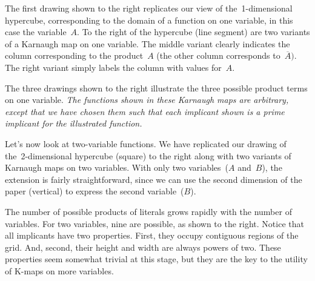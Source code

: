 \begin{minipage}{4.25in}
The first drawing shown to the right replicates our view of 
the~\mbox{1-dimensional} hypercube, corresponding to the domain of a
function on one variable, in this case the variable~$A$.  
To the right of the hypercube (line segment) are two variants
of a Karnaugh map on one variable.  The middle variant clearly 
indicates the column corresponding to the product~$A$ (the other 
column corresponds to~$\overline{A})$.  The right variant simply labels
the column with values for~$A$.
\end{minipage}\hspace{0.25in}%
\begin{minipage}{2.0in}
\vspace{12pt}
\end{minipage}

\begin{minipage}{4.25in}
The three drawings shown to the right illustrate the three possible product
terms on one variable.  {\em The functions shown in 
these Karnaugh maps are arbitrary, except that we have chosen
them such that each implicant shown is a prime implicant for the
illustrated function.}
\end{minipage}\hspace{0.25in}%
\begin{minipage}{2.0in}
\centerline{}
\end{minipage}


\begin{minipage}{3.5in}
Let's now look at two-variable functions.  We have replicated
our drawing of the~\mbox{2-dimensional} hypercube (square) to the right 
along with two variants of Karnaugh maps on two variables.
With only two variables~($A$ and~$B$), the extension is fairly 
straightforward, since we can use the second dimension of the 
paper (vertical) to express the second variable~($B$).
\end{minipage}\hspace{0.25in}%
\begin{minipage}{2.75in}
\end{minipage}

\begin{minipage}{2.15in}
The number of possible products of literals grows rapidly with the 
number of variables.
For two variables, nine are possible, as shown to the right.
Notice that all implicants have two properties.  First, they
occupy contiguous regions of the grid.  And, second, their height
and width are always powers of two.  These properties seem somewhat
trivial at this stage, but they are the key to the utility of
\mbox{K-maps} on more variables.
\end{minipage}\hspace{0.25in}%
\begin{minipage}{4.1in}
\centerline{}
\end{minipage}

